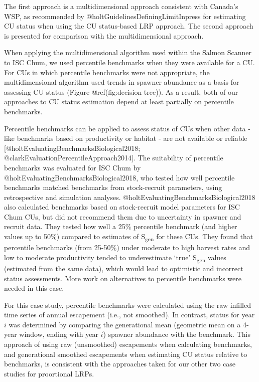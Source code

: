 \documentclass[
]{article}
\begin{document}
The first approach is a multidimensional approach consistent with
Canada's WSP, as recommended by @holtGuidelinesDefiningLimitInpress for
estimating CU status when using the CU status-based LRP approach. The
second approach is presented for comparison with the multidimensional
approach.

When applying the multidimensional algorithm used within the Salmon
Scanner to ISC Chum, we used percentile benchmarks when they were
available for a CU. For CUs in which percentile benchmarks were not
appropriate, the multidimensional algorithm used trends in spawner
abundance as a basis for assessing CU status (Figure
@ref(fig:decision-tree)). As a result, both of our approaches to CU
status estimation depend at least partially on percentile benchmarks.

Percentile benchmarks can be applied to assess status of CUs when other
data - like benchmarks based on productivity or habitat - are not
available or reliable {[}@holtEvaluatingBenchmarksBiological2018;
@clarkEvaluationPercentileApproach2014{]}. The suitability of percentile
benchmarks was evaluated for ISC Chum by
@holtEvaluatingBenchmarksBiological2018, who tested how well percentile
benchmarks matched benchmarks from stock-recruit parameters, using
retrospective and simulation analyses.
@holtEvaluatingBenchmarksBiological2018 also calculated benchmarks based
on stock-recruit model parameters for ISC Chum CUs, but did not
recommend them due to uncertainty in spawner and recruit data. They
tested how well a 25\% percentile benchmark (and higher values up to
50\%) compared to estimates of S\textsubscript{gen} for these CUs. They
found that percentile benchmarks (from 25-50\%) under moderate to high
harvest rates and low to moderate productivity tended to underestimate
`true' S\textsubscript{gen} values (estimated from the same data), which
would lead to optimistic and incorrect status assessments. More work on
alternatives to percentile benchmarks were needed in this case.

For this case study, percentile benchmarks were calculated using the raw
infilled time series of annual escapement (i.e., not smoothed). In
contrast, status for year \(i\) was determined by comparing the
generational mean (geometric mean on a 4-year window, ending with year
\(i\)) spawner abundance with the benchmark. This approach of using raw
(unsmoothed) escapements when calculating benchmarks, and generational
smoothed escapements when estimating CU status relative to benchmarks,
is consistent with the approaches taken for our other two case studies
for proortional LRPs.
\end{document}
